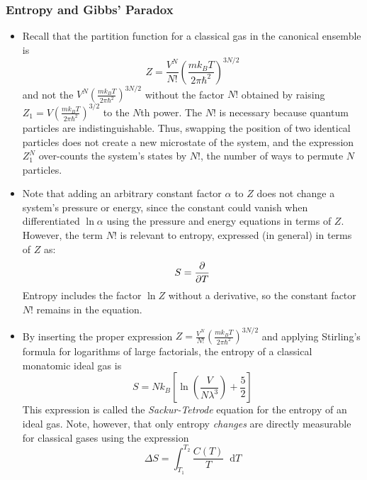 \documentclass[11pt, a4paper]{article}
\newcommand{\diff}{\mathop{}\!\mathrm{d}} %
\begin{document}
\subsubsection{Entropy and Gibbs' Paradox}
\begin{itemize}
	\item Recall that the partition function for a classical gas in the canonical ensemble is 
	\begin{equation*}
		 Z = \frac{V^{N}}{N!} \left(\frac{mk_{B}T}{2\pi \hbar^{2}}\right)^{3N/2}
	\end{equation*}
	and not the $V^{N} \left(\frac{mk_{B}T}{2\pi \hbar^{2}}\right)^{3N/2} $ without the factor $ N! $ obtained by raising $ Z_{1} = V \left(\frac{mk_{B}T}{2\pi \hbar^{2}}\right)^{3/2} $ to the $ N $th power. The $ N! $ is necessary because quantum particles are indistinguishable. Thus, swapping the position of two identical particles does not create a new microstate of the system, and the expression $ Z_{1}^{N} $ over-counts the system's states by $ N! $, the number of ways to permute $ N $ particles.
	
	\item Note that adding an arbitrary constant factor $ \alpha $ to $ Z $ does not change a system's pressure or energy, since the constant could vanish when differentiated $ \ln \alpha $ using the pressure and energy equations in terms of $ Z $. However, the term $ N! $ is relevant to entropy, expressed (in general) in terms of $ Z $ as:
	\begin{equation*}
		S = \pdv{}{T} (k_{B}T \ln Z)
	\end{equation*}
	Entropy includes the factor $ \ln Z $ without a derivative, so the constant factor $ N! $ remains in the equation. 
	
	\item By inserting the proper expression $ Z = \frac{V^{N}}{N!} \left(\frac{mk_{B}T}{2\pi \hbar^{2}}\right)^{3N/2} $ and applying Stirling's formula for logarithms of large factorials, the entropy of a classical monatomic ideal gas is
	\begin{equation*}
		S = N k_{B} \left[\ln(\frac{V}{N\lambda^{3}}) + \frac{5}{2}\right]
	\end{equation*}
	This expression is called the \textit{Sackur-Tetrode} equation for the entropy of an ideal gas. Note, however, that only entropy \textit{changes} are directly measurable for classical gases using the expression
	\begin{equation*}
		\Delta S = \int_{T_{1}}^{T_{2}}\frac{C(T)}{T}\diff T
	\end{equation*}
\end{itemize}
\end{document}
